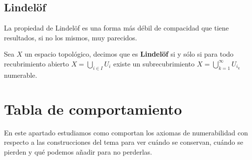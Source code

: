\subsection{Lindelöf}%
\label{sub:lindelof}
La propiedad de Lindelöf es una forma más débil de compacidad que tiene resultados, si no los mismos, muy parecidos.

\begin{defi}[Lindelöf]
Sea $X$ un espacio topológico, decimos que es \textbf{Lindelöf} si y sólo si para todo recubrimiento abierto $X = \bigcup_{i \in I} U_i$ existe un subrecubrimiento $X = \bigcup_{k=1}^{\infty} U_{i_k}$ numerable.
\end{defi}

\section{Tabla de comportamiento}%
\label{sec:tabla_de_comportamiento_num}
En este apartado estudiamos como comportan los axiomas de numerabilidad con respecto a las construcciones del tema  para ver cuándo se conservan, cuándo se pierden y qué podemos añadir para no perderlas.

